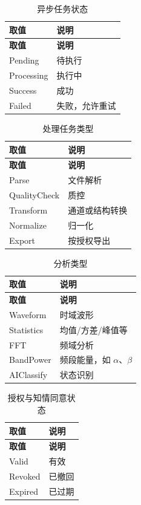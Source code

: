 {\begin{longtable}{|p{28mm}|p{100mm}|}
\caption{异步任务状态} \label{tab:dd-enum-task-status} \\ \hline
\textbf{取值} & \textbf{说明}\\\hline
\endfirsthead
\hline \textbf{取值} & \textbf{说明}\\\hline \endhead
Pending & 待执行 \\ \hline
Processing & 执行中 \\ \hline
Success & 成功 \\ \hline
Failed & 失败，允许重试 \\ \hline
\end{longtable}

\begin{longtable}{|p{28mm}|p{100mm}|}
\caption{处理任务类型} \label{tab:dd-enum-task-type} \\ \hline
\textbf{取值} & \textbf{说明}\\\hline
\endfirsthead
\hline \textbf{取值} & \textbf{说明}\\\hline \endhead
Parse & 文件解析 \\ \hline
QualityCheck & 质控 \\ \hline
Transform & 通道或结构转换 \\ \hline
Normalize & 归一化 \\ \hline
Export & 按授权导出 \\ \hline
\end{longtable}

\begin{longtable}{|p{28mm}|p{100mm}|}
\caption{分析类型} \label{tab:dd-enum-analysis} \\ \hline
\textbf{取值} & \textbf{说明}\\\hline
\endfirsthead
\hline \textbf{取值} & \textbf{说明}\\\hline \endhead
Waveform & 时域波形 \\ \hline
Statistics & 均值/方差/峰值等 \\ \hline
FFT & 频域分析 \\ \hline
BandPower & 频段能量，如 $\alpha$、$\beta$ \\ \hline
AIClassify & 状态识别 \\ \hline
\end{longtable}

\begin{longtable}{|p{28mm}|p{100mm}|}
\caption{授权与知情同意状态} \label{tab:dd-enum-auth} \\ \hline
\textbf{取值} & \textbf{说明}\\\hline
\endfirsthead
\hline \textbf{取值} & \textbf{说明}\\\hline \endhead
Valid & 有效 \\ \hline
Revoked & 已撤回 \\ \hline
Expired & 已过期 \\ \hline
\end{longtable}
}

